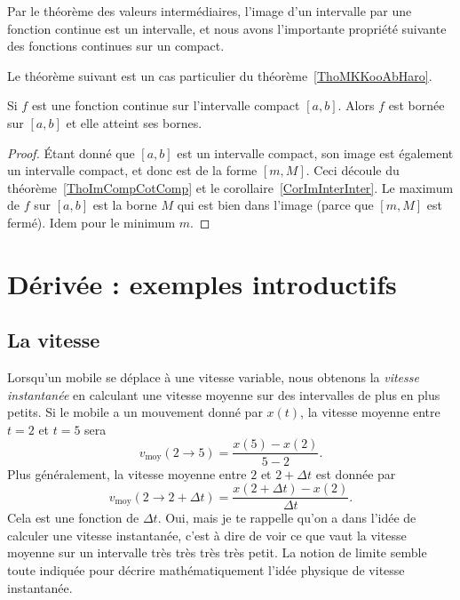 Par le théorème des valeurs intermédiaires, l'image d'un intervalle par une fonction continue est un intervalle, et nous avons l'importante propriété suivante des fonctions continues sur un compact.

Le théorème suivant est un cas particulier du théorème~\ref{ThoMKKooAbHaro}.
\begin{theorem}
    Si $f$ est une fonction continue sur l'intervalle compact $[a,b]$. Alors $f$ est bornée sur $[a,b]$ et elle atteint ses bornes.
\end{theorem}

\begin{proof}
    Étant donné que $[a,b]$ est un intervalle compact, son image est également un intervalle compact, et donc est de la forme $[m,M]$. Ceci découle du théorème~\ref{ThoImCompCotComp} et le corollaire~\ref{CorImInterInter}. Le maximum de $f$ sur $[a,b]$ est la borne $M$ qui est bien dans l'image (parce que $[m,M]$ est fermé). Idem pour le minimum $m$.
\end{proof}

\section{Dérivée : exemples introductifs}

\subsection{La vitesse}

Lorsqu'un mobile se déplace à une vitesse variable, nous obtenons la \emph{vitesse instantanée} en calculant une vitesse moyenne sur des intervalles de plus en plus petits. Si le mobile a un mouvement donné par $x(t)$, la vitesse moyenne entre $t=2$ et $t=5$ sera
\[
  v_{\text{moy}}(2\to 5)=\frac{ x(5)-x(2) }{ 5-2 }.
\]
Plus généralement, la vitesse moyenne entre $2$ et $2+\Delta t$ est donnée par
\[
  v_{\text{moy}}(2\to 2+\Delta t)=\frac{ x(2+\Delta t)-x(2) }{ \Delta t }.
\]
Cela est une fonction de $\Delta t$. Oui, mais je te rappelle qu'on a dans l'idée de calculer une vitesse instantanée, c'est à dire de voir ce que vaut la vitesse moyenne sur un intervalle très {\small très} {\footnotesize très} {\scriptsize très} {\tiny petit}. La notion de limite semble toute indiquée pour décrire mathématiquement l'idée physique de vitesse instantanée.

